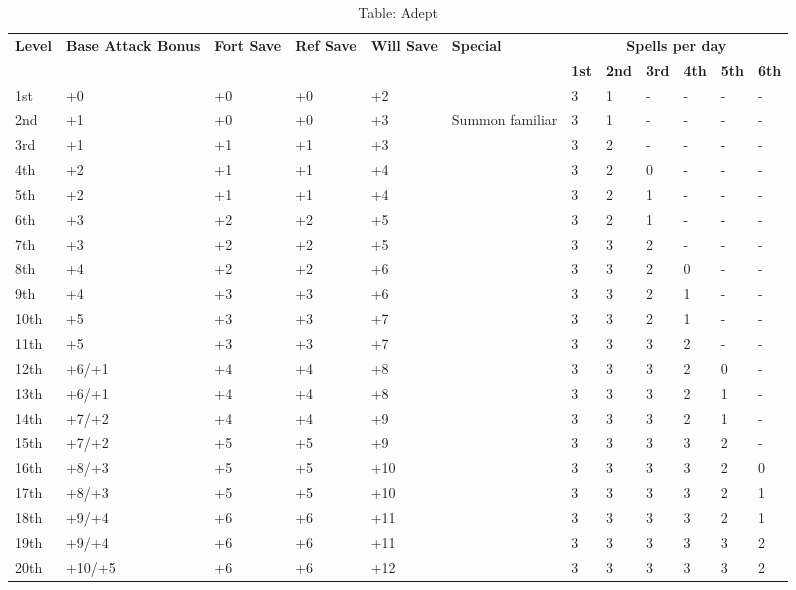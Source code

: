 \begin{table*}[]
\sffamily
\caption{Table: Adept}
\begin{tabularx}{\linewidth}{lp{5em}p{1.5em}p{1.5em}p{1.5em}Xllllll}
\multirow{2}{*}{\textbf{Level}} & \multirow{2}{*}{\parbox{5em}{\textbf{Base Attack Bonus}}} & \multirow{2}{*}{\parbox{1.5em}{\textbf{Fort Save}}} & \multirow{2}{*}{\parbox{1.5em}{\textbf{Ref Save}}} & \multirow{2}{*}{\parbox{1.5em}{\textbf{Will Save}}} & \textbf{Special}                                                                                              & \multicolumn{6}{c}{\textbf{Spells per day}} \\
                       &                                    &                            &                           &                            &                                                                                                      & \textbf{1st}  & \textbf{2nd} & \textbf{3rd} &\textbf{4th} & \textbf{5th} & \textbf{6th} \\
1st & +0 & +0 & +0 & +2 &  & 3 & 1 & - & - & - & -\\
2nd & +1 & +0 & +0 & +3 & Summon familiar & 3 & 1 & - & - & - & -\\
3rd & +1 & +1 & +1 & +3 &  & 3 & 2 & - & - & - & -\\
4th & +2 & +1 & +1 & +4 &  & 3 & 2 & 0 & - & - & -\\
5th & +2 & +1 & +1 & +4 &  & 3 & 2 & 1 & - & - & -\\
6th & +3 & +2 & +2 & +5 &  & 3 & 2 & 1 & - & - & -\\
7th & +3 & +2 & +2 & +5 &  & 3 & 3 & 2 & - & - & -\\
8th & +4 & +2 & +2 & +6 &  & 3 & 3 & 2 & 0 & - & -\\
9th & +4 & +3 & +3 & +6 &  & 3 & 3 & 2 & 1 & - & -\\
10th & +5 & +3 & +3 & +7 &  & 3 & 3 & 2 & 1 & - & -\\
11th & +5 & +3 & +3 & +7 &  & 3 & 3 & 3 & 2 & - & -\\
12th & +6/+1 & +4 & +4 & +8 &  & 3 & 3 & 3 & 2 & 0 & -\\
13th & +6/+1 & +4 & +4 & +8 &  & 3 & 3 & 3 & 2 & 1 & -\\
14th & +7/+2 & +4 & +4 & +9 &  & 3 & 3 & 3 & 2 & 1 & -\\
15th & +7/+2 & +5 & +5 & +9 &  & 3 & 3 & 3 & 3 & 2 & -\\
16th & +8/+3 & +5 & +5 & +10 &  & 3 & 3 & 3 & 3 & 2 & 0\\
17th & +8/+3 & +5 & +5 & +10 &  & 3 & 3 & 3 & 3 & 2 & 1\\
18th & +9/+4 & +6 & +6 & +11 &  & 3 & 3 & 3 & 3 & 2 & 1\\
19th & +9/+4 & +6 & +6 & +11 &  & 3 & 3 & 3 & 3 & 3 & 2\\
20th & +10/+5 & +6 & +6 & +12 &  & 3 & 3 & 3 & 3 & 3 & 2\\
\end{tabularx}
\end{table*}

